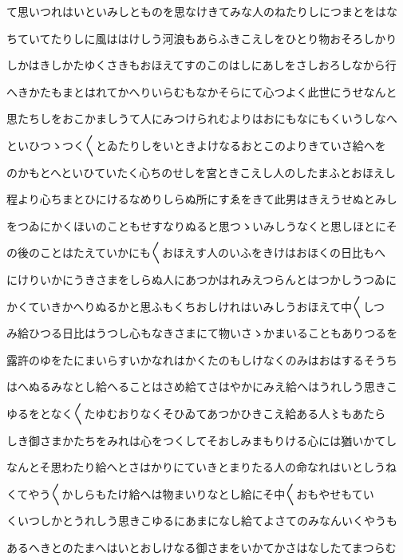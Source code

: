 \documentclass[a4paper,11pt,landscape]{ltjtarticle}
\begin{document}
\par\medskip
て思いつれはいといみしとものを思なけきてみな人のねたりしにつまとをはな
\par\medskip
ちていてたりしに風ははけしう河浪もあらふきこえしをひとり物おそろしかり
\par\medskip
しかはきしかたゆくさきもおほえてすのこのはしにあしをさしおろしなから行
\par\medskip
へきかたもまとはれてかへりいらむもなかそらにて心つよく此世にうせなんと
\par\medskip
思たちしをおこかましうて人にみつけられむよりはおにもなにもくいうしなへ
\par\medskip
といひつゝつく〱とゐたりしをいときよけなるおとこのよりきていさ給へを
\par\medskip
のかもとへといひていたく心ちのせしを宮ときこえし人のしたまふとおほえし
\par\medskip
程より心ちまとひにけるなめりしらぬ所にすゑをきて此男はきえうせぬとみし
\par\medskip
をつゐにかくほいのこともせすなりぬると思つゝいみしうなくと思しほとにそ
\par\medskip
の後のことはたえていかにも〱おほえす人のいふをきけはおほくの日比もへ
\par\medskip
にけりいかにうきさまをしらぬ人にあつかはれみえつらんとはつかしうつゐに
\par\medskip
かくていきかへりぬるかと思ふもくちおしけれはいみしうおほえて中〱しつ
\par\medskip
み給ひつる日比はうつし心もなきさまにて物いさゝかまいることもありつるを
\par\medskip
露許のゆをたにまいらすいかなれはかくたのもしけなくのみはおはするそうち
\par\medskip
はへぬるみなとし給へることはさめ給てさはやかにみえ給へはうれしう思きこ
\par\medskip
ゆるをとなく〱たゆむおりなくそひゐてあつかひきこえ給ある人〻もあたら
\par\medskip
しき御さまかたちをみれは心をつくしてそおしみまもりける心には猶いかてし
\par\medskip
なんとそ思わたり給へとさはかりにていきとまりたる人の命なれはいとしうね
\par\medskip
くてやう〱かしらもたけ給へは物まいりなとし給にそ中〱おもやせもてい
\par\medskip
くいつしかとうれしう思きこゆるにあまになし給てよさてのみなんいくやうも
\par\medskip
あるへきとのたまへはいとおしけなる御さまをいかてかさはなしたてまつらむ
\par\medskip
\end{document}
